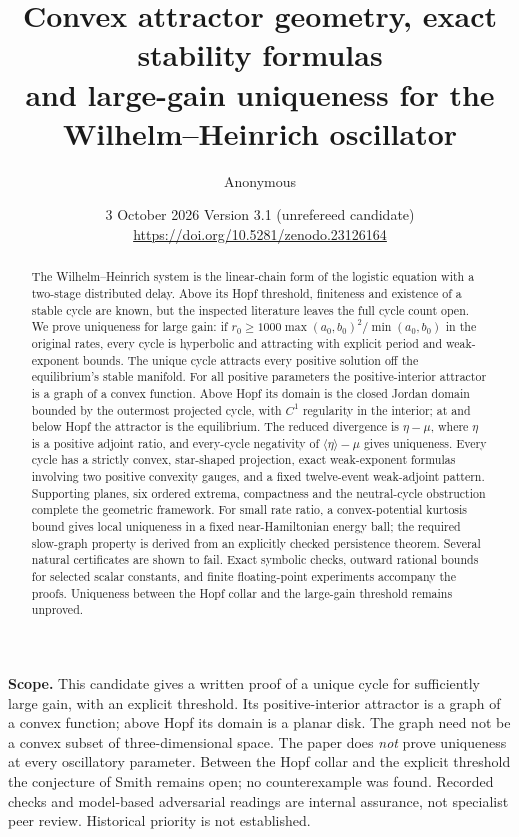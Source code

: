 \documentclass[11pt,a4paper]{article}
\title{Convex attractor geometry, exact stability formulas\\and large-gain uniqueness for the Wilhelm--Heinrich oscillator}
\author{Anonymous}
\date{3 October 2026 \quad Version 3.1 (unrefereed candidate)\\\small\url{https://doi.org/10.5281/zenodo.23126164}}
\begin{document}
\maketitle
\thispagestyle{plain}
\noindent\textbf{Scope.} This candidate gives a written proof of a unique cycle for sufficiently large gain, with an explicit threshold. Its positive-interior attractor is a graph of a convex function; above Hopf its domain is a planar disk. The graph need not be a convex subset of three-dimensional space. The paper does \emph{not} prove uniqueness at every oscillatory parameter. Between the Hopf collar and the explicit threshold the conjecture of Smith remains open; no counterexample was found. Recorded checks and model-based adversarial readings are internal assurance, not specialist peer review. Historical priority is not established.

\begin{abstract}
The Wilhelm--Heinrich system is the linear-chain form of the logistic equation with a two-stage distributed delay. Above its Hopf threshold, finiteness and existence of a stable cycle are known, but the inspected literature leaves the full cycle count open. We prove uniqueness for large gain: if $r_0\ge1000\max(a_0,b_0)^2/\min(a_0,b_0)$ in the original rates, every cycle is hyperbolic and attracting with explicit period and weak-exponent bounds. The unique cycle attracts every positive solution off the equilibrium's stable manifold. For all positive parameters the positive-interior attractor is a graph of a convex function. Above Hopf its domain is the closed Jordan domain bounded by the outermost projected cycle, with $C^1$ regularity in the interior; at and below Hopf the attractor is the equilibrium. The reduced divergence is $\eta-\mu$, where $\eta$ is a positive adjoint ratio, and every-cycle negativity of $\langle\eta\rangle-\mu$ gives uniqueness. Every cycle has a strictly convex, star-shaped projection, exact weak-exponent formulas involving two positive convexity gauges, and a fixed twelve-event weak-adjoint pattern. Supporting planes, six ordered extrema, compactness and the neutral-cycle obstruction complete the geometric framework. For small rate ratio, a convex-potential kurtosis bound gives local uniqueness in a fixed near-Hamiltonian energy ball; the required slow-graph property is derived from an explicitly checked persistence theorem. Several natural certificates are shown to fail. Exact symbolic checks, outward rational bounds for selected scalar constants, and finite floating-point experiments accompany the proofs. Uniqueness between the Hopf collar and the large-gain threshold remains unproved.
\end{abstract}
\end{document}
